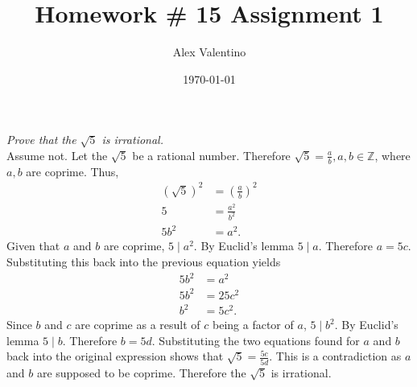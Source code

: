 \documentclass[12pt, letterpaper]{article}
\date{\today}
\title{Homework \# 15 }
\author{Alex Valentino}
\title{Assignment 1}
\newcommand{\Z}{\mathbb{Z}}
\begin{document}
	\textit{Prove that the $\sqrt{5}$ is irrational.}\\
	Assume not.  Let the $\sqrt{5}$ be a rational number.  Therefore $\sqrt{5} = \displaystyle \frac{a}{b}, a,b \in \Z$, where $a,b$ are coprime.  Thus, \begin{align*}
		(\sqrt{5})^2 &= \displaystyle (\frac{a}{b})^2\\
		5&= \displaystyle \frac{a^2}{b^2}\\
		5b^2 &= a^2.
	\end{align*}
	Given that $a$ and $b$ are coprime, $5 \mid a^2.$  By Euclid's lemma $5 \mid a.$ Therefore $a=5c.$  Substituting this back into the previous equation yields \begin{align*}
				5b^2 &= a^2\\
				5b^2 &= 25c^2\\
				b^2 &= 5c^2.
	\end{align*}
				Since $b$ and $c$ are coprime as a result of $c$ being a factor of $a$, $5 \mid b^2.$  By Euclid's lemma $5 \mid b.$  Therefore $b=5d.$  Substituting the two equations found for $a$ and $b$ back into the original expression shows that $\sqrt{5} = \displaystyle \frac{5c}{5d}.$  This is a contradiction as $a$ and $b$ are supposed to be coprime.  Therefore the $\sqrt{5}$ is irrational.  
\end{document}
